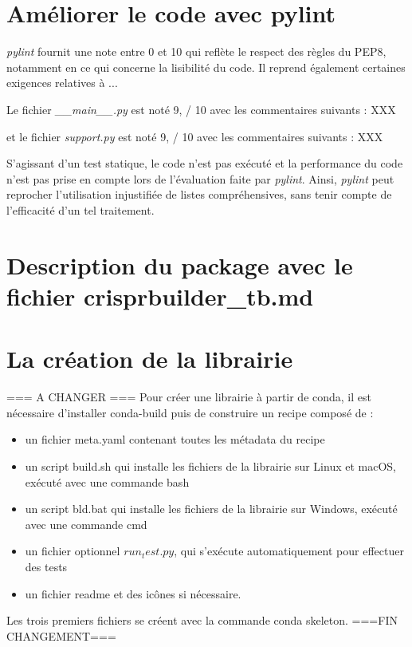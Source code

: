 \documentclass[twoside,a4paper,11pt,frenchb,openany]{report}
\begin{document}
\section{Améliorer le code avec pylint}

\textit{pylint} fournit une note entre 0 et 10 qui reflète le respect des règles du PEP8, notamment en ce qui concerne la lisibilité du code. Il reprend également certaines exigences relatives à ...

Le fichier \textit{\_\_main\_\_.py} est noté 9, / 10 avec les commentaires suivants :
XXX

et le fichier \textit{support.py} est noté 9, / 10 avec les commentaires suivants :
XXX

S'agissant d'un test statique, le code n'est pas exécuté et la performance du code n'est pas prise en compte lors de l'évaluation faite par \textit{pylint}. Ainsi, \textit{pylint} peut reprocher l'utilisation injustifiée de listes compréhensives, sans tenir compte de l'efficacité d'un tel traitement.


\section{Description du package avec le fichier crisprbuilder\_tb.md}




\section{La création de la librairie}

=== A CHANGER ===
Pour créer une librairie à partir de conda, il est nécessaire d'installer conda-build puis de construire un recipe composé de :
\begin{itemize}
\item un fichier meta.yaml contenant toutes les métadata du recipe
\item un script build.sh qui installe les fichiers de la librairie sur Linux et macOS, exécuté avec une commande bash
\item un script bld.bat qui installe les fichiers de la librairie sur Windows, exécuté avec une commande cmd
\item un fichier optionnel $run_test.py$, qui s'exécute automatiquement pour effectuer des tests
\item un fichier readme et des icônes si nécessaire.  
\end{itemize}
Les trois premiers fichiers se créent avec la commande conda skeleton.
===FIN CHANGEMENT===
\end{document}
